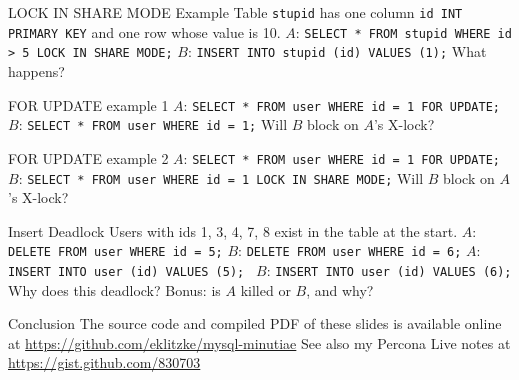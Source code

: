 \documentclass[14pt]{beamer}
\begin{document}
\begin{frame}{LOCK IN SHARE MODE Example}
  Table \texttt{stupid} has one column \texttt{id INT PRIMARY KEY} and one row
  whose value is 10.
  \newline
  \newline
  $A$: \texttt{SELECT * FROM stupid WHERE id > 5 LOCK IN SHARE MODE;}
  \newline
  \newline
  $B$: \texttt{INSERT INTO stupid (id) VALUES (1);}
  \newline
  \newline
  What happens?
\end{frame}


\begin{frame}{FOR UPDATE example 1}
  $A$: \texttt{SELECT * FROM user WHERE id = 1 FOR UPDATE;}
  \newline
  \newline
  $B$: \texttt{SELECT * FROM user WHERE id = 1;}
  \newline
  \newline
  Will $B$ block on $A$'s X-lock?
\end{frame}

\begin{frame}{FOR UPDATE example 2}
  $A$: \texttt{SELECT * FROM user WHERE id = 1 FOR UPDATE;}
  \newline
  \newline
  $B$: \texttt{SELECT * FROM user WHERE id = 1 LOCK IN SHARE MODE;}
  \newline
  \newline
  Will $B$ block on $A$'s X-lock?
\end{frame}

\begin{frame}{Insert Deadlock}
  Users with ids 1, 3, 4, 7, 8 exist in the table at the start.
  \newline
  \newline
  $A$: \texttt{DELETE FROM user WHERE id = 5;}
  \newline
  $B$: \texttt{DELETE FROM user WHERE id = 6;}
  \newline
  $A$: \texttt{INSERT INTO user (id) VALUES (5); }
  \newline
  $B$: \texttt{INSERT INTO user (id) VALUES (6); }
  \newline
  \newline
  Why does this deadlock?
  \newline
  Bonus: is $A$ killed or $B$, and why?
\end{frame}
\begin{frame}{Conclusion}
  The source code and compiled PDF of these slides is available online at
  \newline
  \url{https://github.com/eklitzke/mysql-minutiae}
  \newline
  \newline
  See also my Percona Live notes at
  \newline
  \url{https://gist.github.com/830703}
\end{frame}
\end{document}

